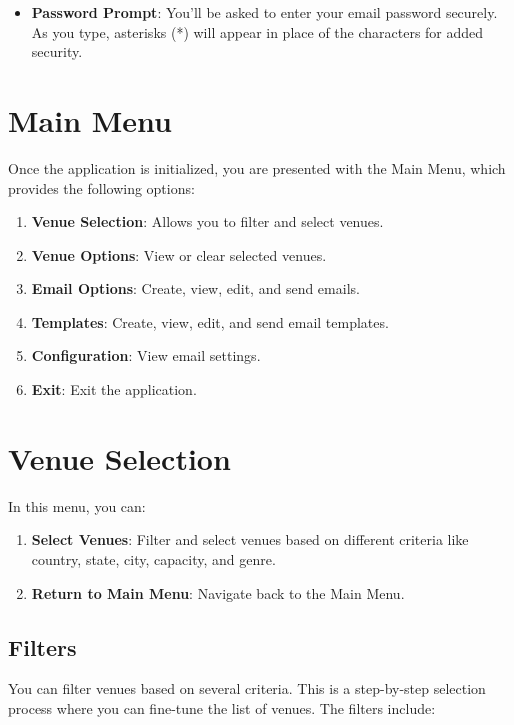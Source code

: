 \documentclass{article}
\begin{document}
\begin{itemize}
	\item \textbf{Password Prompt}: You'll be asked to enter your email password securely. As you type, asterisks (*) will appear in place of the characters for added security.
\end{itemize}

\section{Main Menu}

Once the application is initialized, you are presented with the Main Menu, which provides the following options:

\begin{enumerate}
	\item \textbf{Venue Selection}: Allows you to filter and select venues.
	\item \textbf{Venue Options}: View or clear selected venues.
	\item \textbf{Email Options}: Create, view, edit, and send emails.
	\item \textbf{Templates}: Create, view, edit, and send email templates.
	\item \textbf{Configuration}: View email settings.
	\item \textbf{Exit}: Exit the application.
\end{enumerate}

\section{Venue Selection}

In this menu, you can:

\begin{enumerate}
	\item \textbf{Select Venues}: Filter and select venues based on different criteria like country, state, city, capacity, and genre.
	\item \textbf{Return to Main Menu}: Navigate back to the Main Menu.
\end{enumerate}

\subsection{Filters}

You can filter venues based on several criteria. This is a step-by-step selection process where you can fine-tune the list of venues. The filters include:
\end{document}
